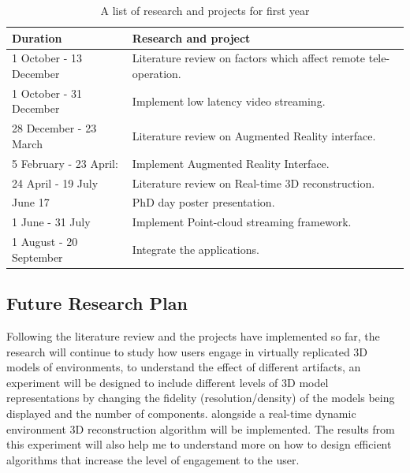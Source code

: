 \begin{table}[ht] 
\begin{tabular}{ p{4.5cm} p{10cm}}
 \hline
 \rowcolor{lightgray}  Duration & Research and project \\
\hline

 1 October - 13 December &  Literature review on factors which affect remote tele-operation. \\

\rowcolor{lightgray} 1 October - 31 December &  Implement low latency video streaming. \\

 28 December - 23 March &  Literature review on Augmented Reality interface. \\

\rowcolor{lightgray} 5 February - 23 April: & Implement Augmented Reality Interface. \\

 24 April - 19 July & Literature review on Real-time 3D reconstruction. \\

\rowcolor{lightgray} June 17 &  PhD day poster presentation.\\

 1 June - 31 July & Implement Point-cloud streaming framework.\\
 
 \rowcolor{lightgray} 1 August - 20 September &  Integrate the applications.\\

\end{tabular}
\caption{A list of research and projects for first year}
\label{table:plan}
\end{table}

\subsection*{Future Research Plan}

Following the literature review and the projects have implemented so far, the research will continue to study  how users engage in virtually replicated 3D models of environments, to understand the effect of different artifacts, an experiment will be designed to include different levels of 3D model representations by changing the fidelity (resolution/density) of the models being displayed and the number of components. alongside a real-time dynamic environment 3D reconstruction algorithm will be implemented. The results from this experiment will also help me to understand more on how to design efficient algorithms that increase the level of engagement to the user.

